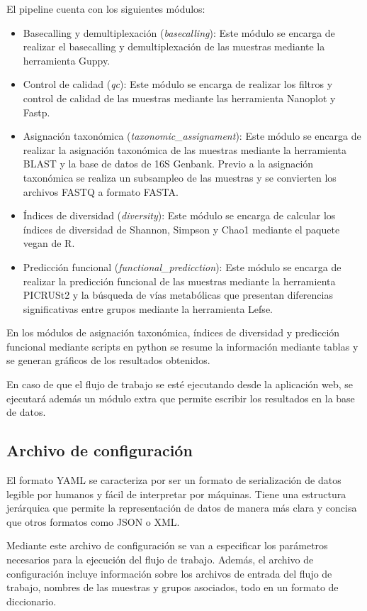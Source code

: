 El pipeline cuenta con los siguientes módulos: 
\begin{itemize}
    \item Basecalling y demultiplexación (\textit{basecalling}): Este módulo se encarga de realizar el basecalling y demultiplexación de las muestras mediante la herramienta Guppy.
    \item Control de calidad (\textit{qc}): Este módulo se encarga de realizar los filtros y control de calidad de las muestras mediante las herramienta Nanoplot y Fastp.
    \item Asignación taxonómica (\textit{taxonomic\_assignament}): Este módulo se encarga de realizar la asignación taxonómica de las muestras mediante la herramienta BLAST y la base de datos de 16S Genbank. Previo a la asignación taxonómica se realiza un subsampleo de las muestras y se convierten los archivos FASTQ a formato FASTA.
    \item Índices de diversidad (\textit{diversity}): Este módulo se encarga de calcular los índices de diversidad de Shannon, Simpson y Chao1 mediante el paquete vegan de R.
    \item Predicción funcional (\textit{functional\_predicction}): Este módulo se encarga de realizar la predicción funcional de las muestras mediante la herramienta PICRUSt2 y la búsqueda de vías metabólicas que presentan diferencias significativas entre grupos mediante la herramienta Lefse.
\end{itemize}

En los módulos de asignación taxonómica, índices de diversidad y predicción funcional mediante scripts en python se resume la información mediante tablas y se generan gráficos de los resultados obtenidos.

En caso de que el flujo de trabajo se esté ejecutando desde la aplicación web, se ejecutará además un módulo extra que permite escribir los resultados en la base de datos.

\subsection{Archivo de configuración}
El formato YAML se caracteriza por ser un formato de serialización de datos legible por humanos y fácil de interpretar por máquinas.
Tiene una estructura jerárquica que permite la representación de datos de manera más clara y concisa que otros formatos como JSON o XML.

Mediante este archivo de configuración se van a especificar los parámetros necesarios para la ejecución del flujo de trabajo.
Además, el archivo de configuración incluye información sobre los archivos de entrada del flujo de trabajo, nombres de las muestras y grupos asociados, todo en un formato de diccionario.

